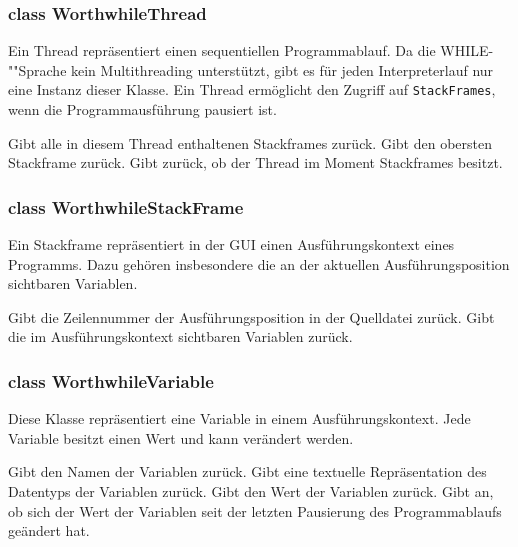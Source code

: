 \subsubsection{class WorthwhileThread}

Ein Thread repräsentiert einen sequentiellen Programmablauf. Da die WHILE-""Sprache kein Multithreading unterstützt, gibt es für jeden Interpreterlauf nur eine Instanz dieser Klasse. Ein Thread ermöglicht den Zugriff auf \texttt{StackFrames}, wenn die Programmausführung pausiert ist.

\begin{description}
	 Gibt alle in diesem Thread enthaltenen Stackframes zurück.
	 Gibt den obersten Stackframe zurück.
	 Gibt zurück, ob der Thread im Moment Stackframes besitzt.
\end{description}

\subsubsection{class WorthwhileStackFrame}

Ein Stackframe repräsentiert in der GUI einen Ausführungskontext eines Programms. Dazu gehören insbesondere die an der aktuellen Ausführungsposition sichtbaren Variablen.

\begin{description}
	 Gibt die Zeilennummer der Ausführungsposition in der Quelldatei zurück.
	 Gibt die im Ausführungskontext sichtbaren Variablen zurück.
\end{description}

\subsubsection{class WorthwhileVariable}

Diese Klasse repräsentiert eine Variable in einem Ausführungskontext. Jede Variable besitzt einen Wert und kann verändert werden.

\begin{description}
	 Gibt den Namen der Variablen zurück.
	 Gibt eine textuelle Repräsentation des Datentyps der Variablen zurück.
	 Gibt den Wert der Variablen zurück.
	 Gibt an, ob sich der Wert der Variablen seit der letzten Pausierung des Programmablaufs geändert hat.
\end{description}

